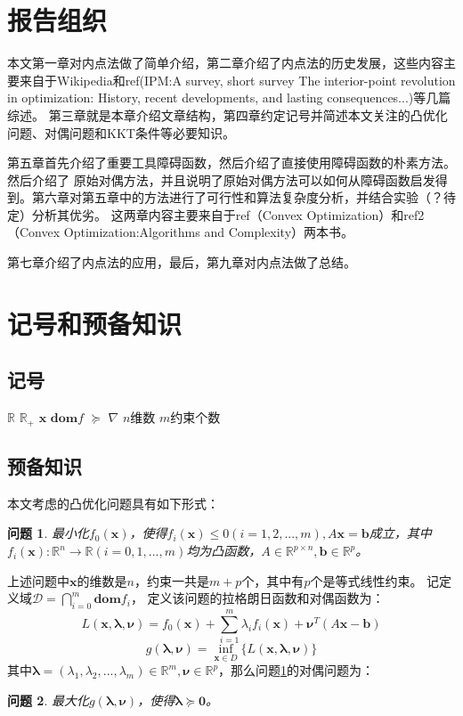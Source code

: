 \documentclass{article}
\newtheorem{problem}{问题}
\begin{document}
\section{报告组织}
本文第一章对内点法做了简单介绍，第二章介绍了内点法的历史发展，这些内容主要来自于Wikipedia和ref(IPM:A survey, short survey The interior-point revolution in optimization: History, recent developments, and lasting consequences...)等几篇综述。
第三章就是本章介绍文章结构，第四章约定记号并简述本文关注的凸优化问题、对偶问题和KKT条件等必要知识。

第五章首先介绍了重要工具障碍函数，然后介绍了直接使用障碍函数的朴素方法。然后介绍了
原始对偶方法，并且说明了原始对偶方法可以如何从障碍函数启发得到。第六章对第五章中的方法进行了可行性和算法复杂度分析，并结合实验（？待定）分析其优劣。
这两章内容主要来自于ref（Convex Optimization）和ref2（Convex Optimization:Algorithms and Complexity）两本书。

第七章介绍了内点法的应用，最后，第九章对内点法做了总结。
\section{记号和预备知识}
\subsection{记号}
$\mathbb{R}$ $\mathbb{R}_+$
$\bm x$ $\textbf{dom}f$
$\succeq$
$\nabla$
$n$维数 $m$约束个数
\subsection{预备知识}
本文考虑的凸优化问题具有如下形式：
\begin{problem}
最小化$f_0(\bm x)$，使得$f_i(\bm x)\le 0(i=1,2,...,m),A\bm x=\bm{b}$成立，其中$f_i(\bm x):\mathbb{R}^n\rightarrow\mathbb{R}(i=0,1,...,m)$均为凸函数，$A\in\mathbb{R}^{p\times n},\bm b\in\mathbb{R}^p$。
\label{general_convex_prob}
\end{problem}

上述问题中$\bm x$的维数是$n$，约束一共是$m+p$个，其中有$p$个是等式线性约束。
记定义域$\mathcal{D}=\bigcap\limits_{i=0}^{m}\textbf{dom}f_i$，
定义该问题的拉格朗日函数和对偶函数为：
\begin{equation}
    L(\bm x,\bm\lambda, \bm\nu)=f_0(\bm x)+\sum\limits_{i=1}^m\lambda_if_i(\bm x)+\bm\nu^T(A\bm x-\bm b)\label{lagrange_function}
\end{equation}
\begin{equation}
    g(\bm\lambda, \bm\nu)=\inf_{\bm x\in D}\{L(\bm x,\bm\lambda, \bm\nu)\}\label{dual_function}
\end{equation}
其中$\bm\lambda=(\lambda_1,\lambda_2,...,\lambda_m)\in\mathbb R^m,\bm\nu\in\mathbb{R}^p$，那么问题\ref{general_convex_prob}的对偶问题为：
\begin{problem}
最大化$g(\bm\lambda,\bm\nu)$，使得$\bm\lambda\succeq\bm 0$。\label{dual_problem}
\end{problem}
\end{document}
